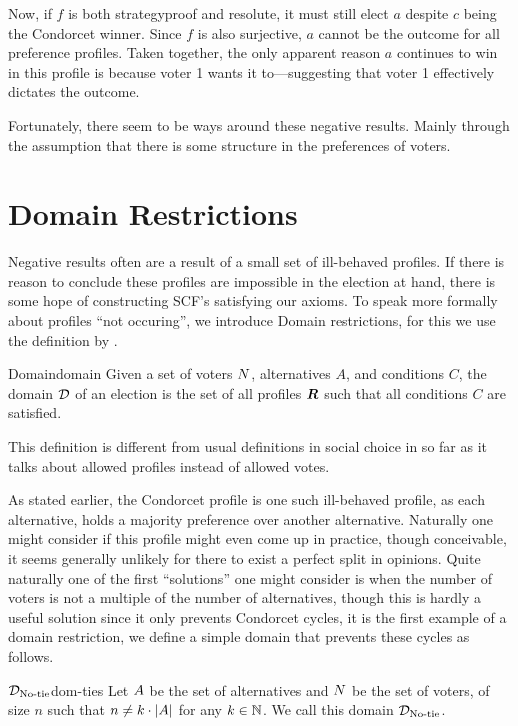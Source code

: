Now, if $f$ is both strategyproof and resolute, it must still elect $a$ despite
$c$ being the Condorcet winner. Since $f$ is also surjective, $a$ cannot be the
outcome for all preference profiles. Taken together, the only apparent reason
$a$ continues to win in this profile is because voter 1 wants it to—suggesting
that voter 1 effectively dictates the outcome.

Fortunately, there seem to be ways around these negative results. Mainly
through the assumption that there is some structure in the preferences of
voters.

\section{Domain Restrictions} \label{sec: Domain-res}

Negative results often are a result of a small set of ill-behaved profiles. If there is
reason to conclude these profiles are impossible in the election at hand, there
is some hope of constructing SCF's satisfying our axioms. To speak more
formally about profiles ``not occuring'', we introduce Domain restrictions, for
this we use the definition by
\citet{elkindPreferenceRestrictionsComputational2022}.

\begin{definition}{Domain}{domain}
	{
		Given a set of voters $N$, alternatives $A$, and conditions $C$, the domain $\mathcal{D}_{\textnormal{}}$ of an election is the set of all profiles $\boldsymbol{R}$ such that all conditions $C$ are satisfied.
	}
\end{definition}

This definition is different from usual definitions in social choice in so far as it talks about allowed profiles instead of allowed votes.

As stated earlier, the Condorcet profile is one such ill-behaved profile, as
each alternative, holds a majority preference over another alternative.
Naturally one might consider if this profile might even come up in practice,
though conceivable, it seems generally unlikely for there to exist a perfect
split in opinions. Quite naturally one of the first ``solutions'' one might
consider is when the number of voters is not a multiple of the number of
alternatives, though this is hardly a useful solution since it only prevents
Condorcet cycles, it is the first example of a domain restriction, we define a
simple domain that prevents these cycles as follows.

\begin{definition}{$\mathcal{D}_{\textnormal{No-tie}}$}{dom-ties}
	Let $A$ be the set of alternatives and $N$ be the set of voters, of size $n$ such that $n \neq k \cdot |A|$ for any $k \in \mathbb{N}$. We call this domain $\mathcal{D}_{\textnormal{No-tie}}$.
\end{definition}

